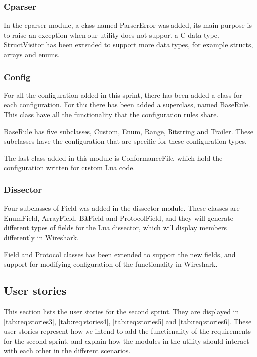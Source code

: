 \subsubsection{Cparser}
In the cparser module, a class named ParserError was added, its main purpose
is to raise an exception when our utility does not support a C 
data type. StructVisitor has been extended to support more data types, for 
example structs, arrays and enums.

\subsubsection{Config}
For all the configuration added in this sprint, there has been added a class 
for each configuration. For this there has been added a superclass, named 
BaseRule. This class have all the functionality that the configuration rules 
share. 

BaseRule has five subclasses, Custom, Enum, Range, Bitstring and Trailer. 
These subclasses have the configuration that are specific for these 
configuration types.

The last class added in this module is ConformanceFile, which hold the 
configuration written for custom Lua code. 

\subsubsection{Dissector}
Four subclasses of Field was added in the dissector module. These classes 
are EnumField, ArrayField, BitField and ProtocolField, and they will 
generate different types of fields for the Lua dissector, which will display 
members differently in Wireshark.

Field and Protocol classes has been extended to support the new fields, and 
support for modifying configuration of the functionality in Wireshark.

\subsection{User stories}
\label{sec:req:stories2}
This section lists the user stories for the second sprint. They are displayed in \autoref{tab:req:stories3}, \autoref{tab:req:stories4},
\autoref{tab:req:stories5} and \autoref{tab:req:stories6}.
These user stories represent how we intend to add the functionality of the requirements for the second sprint,
and explain how the modules in the utility should interact with each other in the different scenarios.

